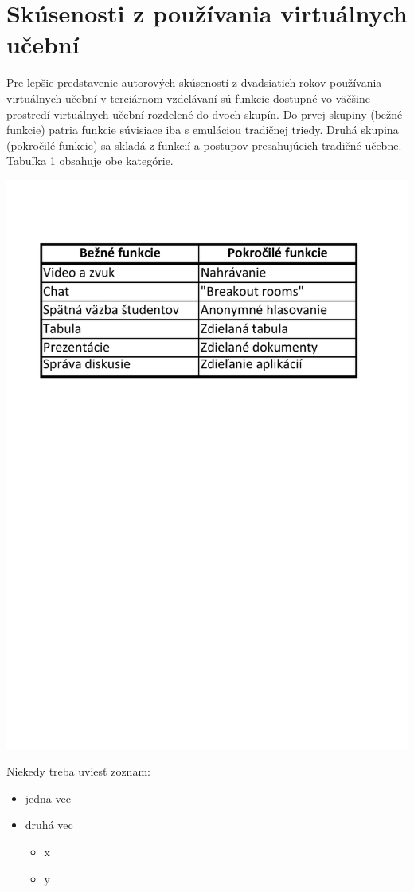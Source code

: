 \documentclass[10pt,twoside,slovak,a4paper]{article}
\begin{document}
\section{Skúsenosti z používania virtuálnych učební} \label{ina}

Pre lepšie predstavenie autorových skúseností z dvadsiatich rokov používania virtuálnych učební 
v terciárnom vzdelávaní sú funkcie dostupné vo väčšine prostredí virtuálnych učební rozdelené do 
dvoch skupín. Do prvej skupiny (bežné funkcie) patria funkcie súvisiace iba s emuláciou tradičnej triedy. 
Druhá skupina (pokročilé funkcie) sa skladá z funkcií a postupov presahujúcich tradičné učebne. 
Tabuľka 1 obsahuje obe kategórie.\cite{VCf}

\includegraphics[scale=0.5]{tab1.pdf}

Niekedy treba uviesť zoznam:

\begin{itemize}
\item jedna vec
\item druhá vec
	\begin{itemize}
	\item x
	\item y
	\end{itemize}
\end{itemize}
\end{document}
